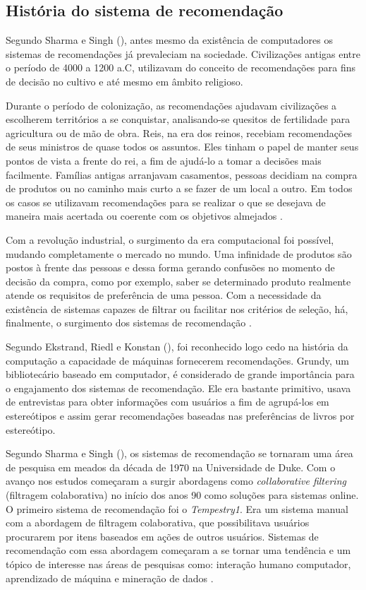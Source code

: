 \subsection{História do sistema de recomendação}

Segundo Sharma e Singh (\citeyear{Sharma:2016}), antes mesmo da existência de computadores os sistemas de recomendações já prevaleciam na sociedade. Civilizações antigas entre o período de 4000 a 1200 a.C, utilizavam do conceito de recomendações para fins de decisão no cultivo e até mesmo em âmbito religioso.

Durante o período de colonização, as recomendações ajudavam civilizações a escolherem territórios a se conquistar, analisando-se quesitos de fertilidade para agricultura ou de mão de obra. Reis, na era dos reinos, recebiam recomendações de seus ministros de quase todos os assuntos. Eles tinham o papel de manter seus pontos de vista a frente do rei, a fim de ajudá-lo a tomar a decisões mais facilmente. Famílias antigas arranjavam casamentos, pessoas decidiam na compra de produtos ou no caminho mais curto a se fazer de um local a outro. Em todos os casos se utilizavam recomendações para se realizar o que se desejava de maneira mais acertada ou coerente com os objetivos almejados \cite{Sharma:2016}.

Com a revolução industrial, o surgimento da era computacional foi possível, mudando completamente o mercado no mundo. Uma infinidade de produtos são postos à frente das pessoas e dessa forma gerando confusões no momento de decisão da compra, como por exemplo, saber se determinado produto realmente atende os requisitos de preferência de uma pessoa. Com a necessidade da existência de sistemas capazes de filtrar ou facilitar nos critérios de seleção, há, finalmente, o surgimento dos sistemas de recomendação \cite{Sharma:2016}.

Segundo Ekstrand, Riedl e Konstan (\citeyear{Ekstrand:2011:CFR:2185827.2185828}), foi reconhecido logo cedo na história da computação a capacidade de máquinas fornecerem recomendações. Grundy, um bibliotecário baseado em computador, é considerado de grande importância para o engajamento dos sistemas de recomendação. Ele era bastante primitivo, usava de entrevistas para obter informações com usuários a fim de agrupá-los em estereótipos e assim gerar recomendações  baseadas nas preferências de livros por estereótipo.

    Segundo Sharma e Singh (\citeyear{Sharma:2016}), os sistemas de recomendação se tornaram uma área de pesquisa em meados da década de 1970 na Universidade de Duke. Com o avanço nos estudos começaram a surgir abordagens como \textit{collaborative filtering} (filtragem colaborativa) no início dos anos 90 como soluções para sistemas online. O primeiro sistema de recomendação foi o \textit{Tempestry1}. Era um sistema manual com a abordagem de filtragem colaborativa, que possibilitava usuários procurarem por itens baseados em ações de outros usuários. Sistemas de recomendação com essa abordagem começaram a se tornar uma tendência e um tópico de interesse nas áreas de pesquisas como: interação humano computador, aprendizado de máquina e mineração de dados \cite{Ekstrand:2011:CFR:2185827.2185828}. 

